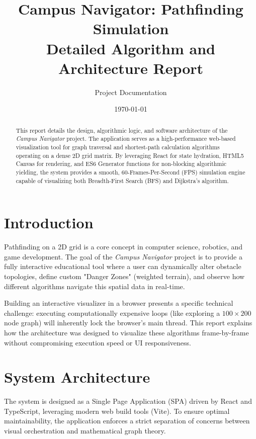 \documentclass[12pt, a4paper]{article}
\title{\textbf{Campus Navigator: Pathfinding Simulation} \\ \large Detailed Algorithm and Architecture Report}
\author{Project Documentation}
\date{\today}
\begin{document}
\maketitle

\begin{abstract}
This report details the design, algorithmic logic, and software architecture of the \textit{Campus Navigator} project. The application serves as a high-performance web-based visualization tool for graph traversal and shortest-path calculation algorithms operating on a dense 2D grid matrix. By leveraging React for state hydration, HTML5 Canvas for rendering, and ES6 Generator functions for non-blocking algorithmic yielding, the system provides a smooth, 60-Frames-Per-Second (FPS) simulation engine capable of visualizing both Breadth-First Search (BFS) and Dijkstra's algorithm.
\end{abstract}

\tableofcontents
\newpage

\section{Introduction}
Pathfinding on a 2D grid is a core concept in computer science, robotics, and game development. The goal of the \textit{Campus Navigator} project is to provide a fully interactive educational tool where a user can dynamically alter obstacle topologies, define custom "Danger Zones" (weighted terrain), and observe how different algorithms navigate this spatial data in real-time. 

Building an interactive visualizer in a browser presents a specific technical challenge: executing computationally expensive loops (like exploring a $100 \times 200$ node graph) will inherently lock the browser's main thread. This report explains how the architecture was designed to visualize these algorithms frame-by-frame without compromising execution speed or UI responsiveness.

\section{System Architecture}
The system is designed as a Single Page Application (SPA) driven by React and TypeScript, leveraging modern web build tools (Vite). To ensure optimal maintainability, the application enforces a strict separation of concerns between visual orchestration and mathematical graph theory.
\end{document}

